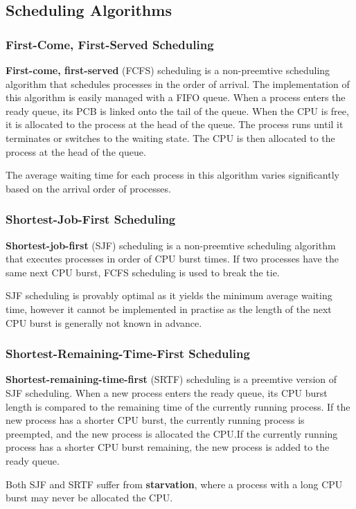 \documentclass{article}
\begin{document}
\subsection{Scheduling Algorithms}
\subsubsection{First-Come, First-Served Scheduling}
\textbf{First-come, first-served} (FCFS) scheduling is a non-preemtive
scheduling algorithm that \linebreak schedules processes in the order of arrival.
The implementation of this algorithm is easily managed with a FIFO
queue. When a process enters the ready queue, its PCB is linked onto
the tail of the queue. When the CPU is free, it is allocated to the
process at the head of the queue. The process runs until it terminates
or switches to the waiting state. The CPU is then allocated to the
process at the head of the queue.

The average waiting time for each process in this algorithm varies
significantly based on the arrival order of processes.
\subsubsection{Shortest-Job-First Scheduling}
\textbf{Shortest-job-first} (SJF) scheduling is a non-preemtive
scheduling algorithm that executes processes in order of CPU burst
times. If two processes have the same next CPU burst, FCFS scheduling is
used to break the tie.

SJF scheduling is provably optimal as it yields the minimum average
waiting time, however it cannot be implemented in practise as the
length of the next CPU burst is generally not known in advance.
\subsubsection{Shortest-Remaining-Time-First Scheduling}
\textbf{Shortest-remaining-time-first} (SRTF) scheduling is a preemtive
version of SJF scheduling. When a new process enters the ready queue,
its CPU burst length is compared to the remaining time of the currently
running process. If the new process has a shorter CPU burst, the
currently running process is preempted, and the new process is
allocated the CPU.\@ If the currently running process has a shorter CPU
burst remaining, the new process is added to the ready queue.

Both SJF and SRTF suffer from \textbf{starvation}, where a process with
a long CPU burst may never be allocated the CPU.\@
\end{document}
